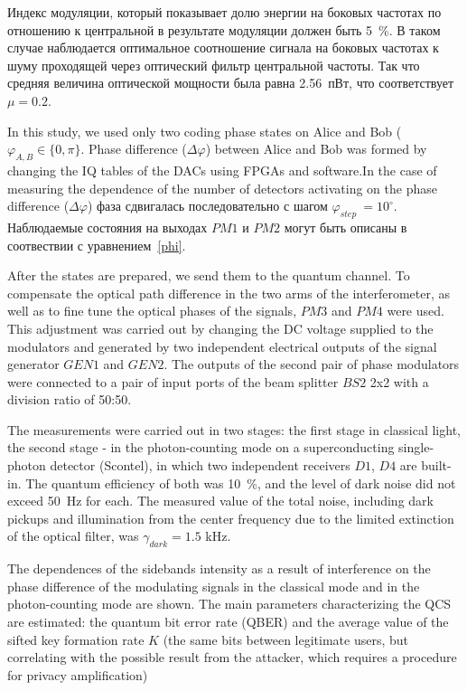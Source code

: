 Индекс модуляции, который показывает долю энергии на боковых частотах по отношению к центральной в результате модуляции должен быть 5~\%. В таком случае наблюдается оптимальное соотношение сигнала на боковых частотах к шуму проходящей через оптический фильтр центральной частоты.  Так что средняя величина оптической мощности была равна 2.56~пВт, что соответствует $\mu=0.2$.  


In this study, we used only two coding phase states on Alice and Bob ($\varphi_{A,B}\in\{0,\pi\}$. Phase difference ($\Delta\varphi$) between Alice and Bob was formed by changing the IQ tables of the DACs using FPGAs and software.In the case of measuring the dependence of the number of detectors activating on the phase difference ($\Delta\varphi$) фаза сдвигалась последовательно с шагом $\varphi_{step}\ = 10^{\circ}$. Наблюдаемые состояния на выходах $PM1$ и $PM2$ могут быть описаны в соотвествии с уравнением~\ref{phi}.

After the states are prepared, we send them to the quantum channel. To compensate the optical path difference in the two arms of the interferometer, as well as to fine tune the optical phases of the signals, $PM3$ and $PM4$ were used. This adjustment was carried out by changing the DC voltage supplied to the modulators and generated by two independent electrical outputs of the signal generator $GEN1$ and $GEN2$. The outputs of the second pair of phase modulators were connected to a pair of input ports of the beam splitter $BS2$ 2x2 with a division ratio of 50:50.

The measurements were carried out in two stages: the first stage in classical light, the second stage - in the photon-counting mode on a superconducting single-photon detector (Scontel), in which two independent receivers $D1$, $D4$ are built-in. The quantum efficiency of both was 10~\%, and the level of dark noise did not exceed 50~Hz for each. The measured value of the total noise, including dark pickups and illumination from the center frequency due to the limited extinction of the optical filter, was $\gamma_{dark} = 1.5$ kHz.

The dependences of the sidebands intensity as a result of interference on the phase difference of the modulating signals in the classical mode and in the photon-counting mode are shown. The main parameters characterizing the QCS are estimated: the quantum bit error rate (QBER) and the average value of the sifted key formation rate $ K $ (the same bits between legitimate users, but correlating with the possible result from the attacker, which requires a procedure for privacy amplification)



